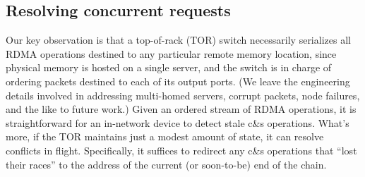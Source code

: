 





\subsection{Resolving concurrent requests}

Our key observation is that a top-of-rack (TOR) switch necessarily
serializes all RDMA operations destined to any particular remote memory
location, since physical memory is hosted on a single server, and the
switch is in charge of ordering packets destined to each of its output
ports.  (We leave the engineering details involved in addressing
multi-homed servers, corrupt packets, node failures, and the like to
future work.)  Given an ordered stream of RDMA operations, it is
straightforward for an in-network device to detect stale c\&s
operations.  What's more, if the TOR maintains just a modest amount of
state, it can resolve conflicts in flight.  Specifically, it suffices
to redirect any c\&s operations that ``lost their races'' to the
address of the current (or soon-to-be) end of the chain.

